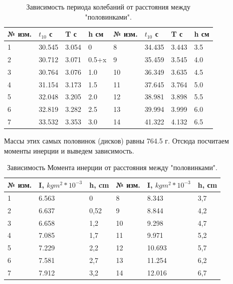 \documentclass[12pt,a4paper]{article}
\begin{document}
\begin{table}[b]
			\begin{center}
				\begin{tabular}{| l | l || l | l || l | l || l | l ||}
					\hline
					№ изм. & $t_{10}$  с & T  с & h  см & № изм. & $t_{10}$  с & T  с & h  см\\ \hline
					1 & 30.545 & 3.054 & 0 & 8 & 34.435 & 3.443 & 3.5 \\ \hline
					2 & 30.712 & 3.071 & 0.5+x & 9 & 35.459 & 3.545 & 4.0 \\ \hline
					3 & 30.764 & 3.076 & 1.0 & 10 & 36.349 &3.635 & 4.5 \\ \hline
					4 & 31.154 & 3.173 & 1.5 & 11 & 37.645 & 3.764 & 5.0 \\ \hline
					5 & 32.048 & 3.205 & 2.0 & 12 & 38.981 & 3.898 & 5.5 \\ \hline
					6 &  32.819& 3.282 & 2.5 & 13 & 39.994 & 3.999 & 6.0 \\ \hline
					7 & 33.532 & 3.353 & 3.0 & 14 & 41.322 & 4.132 & 6.5 \\ \hline
				\end{tabular}
				\caption{Зависимость периода колебаний от расстояния между "половинками".}
				\label{tab:period}
			\end{center}
		\end{table}
Массы этих самых половинок (дисков) равны 764.5 г. Отсюда посчитаем моменты инерции и выведем зависимость.
\begin{table}[t]
			\begin{center}
				\begin{tabular}{| l | l | l || l | l | l |}
					\hline
					№ изм. & I, $kgm^2 * 10^{-3}$ & h, cm & № изм. & I, $kgm^2 * 10^{-3}$ & h, сm \\ \hline
					1 & 6.563 & 0 & 8 & 8.343 & 3,7 \\ \hline
					2 & 6.637 & 0,52 & 9 & 8.844 & 4,2 \\ \hline
					3 & 6.658 & 1,2 & 10 & 9.298 & 4,7 \\ \hline
					4 & 7.085 & 1,7 & 11 & 9.971 & 5,2 \\ \hline
					5 & 7.229 & 2,2 & 12 & 10.693 & 5,7 \\ \hline
					6 & 7.581 & 2,7 & 13 & 11.254 & 6,2 \\ \hline
					7 & 7.912 & 3,2 & 14 & 12.016 & 6,7 \\ \hline
				\end{tabular}
				\caption{Зависимость Момента инерции от расстояния между "половинками".}
				\label{tab:moment}
			\end{center}
		\end{table}
\end{document}
